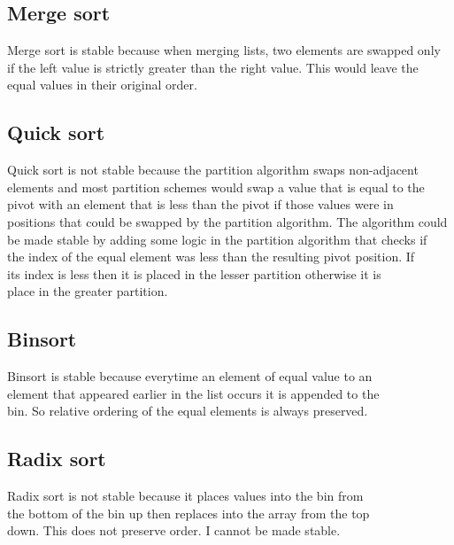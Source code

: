 \documentclass[11pt]{article}
\begin{document}
\subsection{Merge sort}
\label{sec:org1ca6045}
Merge sort is stable because when merging lists, two elements are swapped only\\
if the left value is strictly greater than the right value. This would leave the\\
equal values in their original order.\\
\subsection{Quick sort}
\label{sec:orga5bfc36}
Quick sort is not stable because the partition algorithm swaps non-adjacent\\
elements and most partition schemes would swap a value that is equal to the\\
pivot with an element that is less than the pivot if those values were in\\
positions that could be swapped by the partition algorithm. The algorithm could\\
be made stable by adding some logic in the partition algorithm that checks if\\
the index of the equal element was less than the resulting pivot position. If\\
its index is less then it is placed in the lesser partition otherwise it is\\
place in the greater partition.\\
\subsection{Binsort}
\label{sec:org23d2fa5}
Binsort is stable because everytime an element of equal value to an\\
element that appeared earlier in the list occurs it is appended to the\\
bin. So relative ordering of the equal elements is always preserved.\\
\subsection{Radix sort}
\label{sec:org40976db}
Radix sort is not stable because it places values into the bin from\\
the bottom of the bin up then replaces into the array from the top\\
down. This does not preserve order. I cannot be made stable.\\
\end{document}
